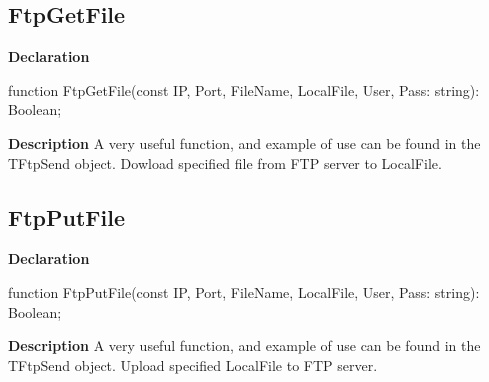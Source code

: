 \documentclass{report}
\newif\ifpdf
\begin{document}
\subsection*{FtpGetFile}
\fi
\label{ftpsend-FtpGetFile}
\begin{list}{}{
\setlength{\itemindent}{0cm}
\setlength{\listparindent}{0cm}
\setlength{\leftmargin}{\evensidemargin}
\addtolength{\leftmargin}{\tmplength}
\settowidth{\labelsep}{X}
\addtolength{\leftmargin}{\labelsep}
\setlength{\labelwidth}{\tmplength}
}
\item[\textbf{Declaration}\hfill]
\ifpdf
\begin{flushleft}
\fi
\begin{ttfamily}
function FtpGetFile(const IP, Port, FileName, LocalFile, User, Pass: string): Boolean;\end{ttfamily}

\ifpdf
\end{flushleft}
\fi

\par
\item[\textbf{Description}]
A very useful function, and example of use can be found in the TFtpSend object. Dowload specified file from FTP server to LocalFile.

\end{list}
\ifpdf
\subsection*{\large{\textbf{FtpPutFile}}\normalsize\hspace{1ex}\hrulefill}
\else
\subsection*{FtpPutFile}
\fi
\label{ftpsend-FtpPutFile}
\begin{list}{}{
\setlength{\itemindent}{0cm}
\setlength{\listparindent}{0cm}
\setlength{\leftmargin}{\evensidemargin}
\addtolength{\leftmargin}{\tmplength}
\settowidth{\labelsep}{X}
\addtolength{\leftmargin}{\labelsep}
\setlength{\labelwidth}{\tmplength}
}
\item[\textbf{Declaration}\hfill]
\ifpdf
\begin{flushleft}
\fi
\begin{ttfamily}
function FtpPutFile(const IP, Port, FileName, LocalFile, User, Pass: string): Boolean;\end{ttfamily}

\ifpdf
\end{flushleft}
\fi

\par
\item[\textbf{Description}]
A very useful function, and example of use can be found in the TFtpSend object. Upload specified LocalFile to FTP server.

\end{list}
\ifpdf
\end{document}
